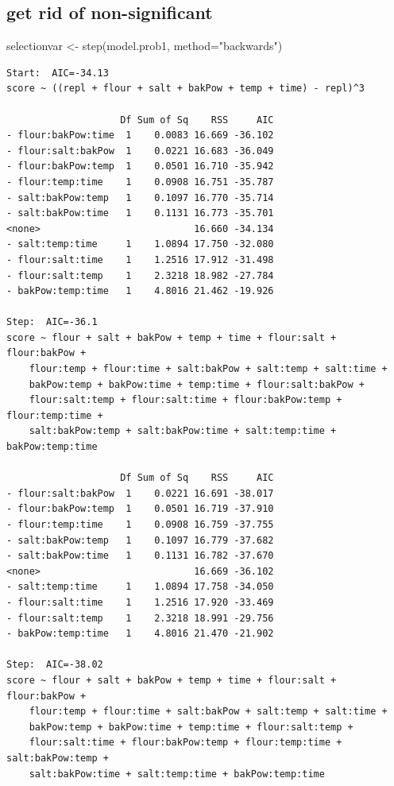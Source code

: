 \documentclass[
  a4paper,
]{scrbook}
\newenvironment{Shaded}{\begin{snugshade}}{\end{snugshade}}
\newcommand{\AttributeTok}[1]{\textcolor[rgb]{0.40,0.45,0.13}{#1}}
\newcommand{\FunctionTok}[1]{\textcolor[rgb]{0.28,0.35,0.67}{#1}}
\newcommand{\NormalTok}[1]{\textcolor[rgb]{0.00,0.23,0.31}{#1}}
\newcommand{\OtherTok}[1]{\textcolor[rgb]{0.00,0.23,0.31}{#1}}
\newcommand{\StringTok}[1]{\textcolor[rgb]{0.13,0.47,0.30}{#1}}
\begin{document}
\subsection{get rid of
non-significant}\label{get-rid-of-non-significant}

\begin{Shaded}
\begin{Highlighting}[]
\NormalTok{selectionvar }\OtherTok{\textless{}{-}} \FunctionTok{step}\NormalTok{(model.prob1, }\AttributeTok{method=}\StringTok{"backwards"}\NormalTok{)}
\end{Highlighting}
\end{Shaded}

\begin{verbatim}
Start:  AIC=-34.13
score ~ ((repl + flour + salt + bakPow + temp + time) - repl)^3

                    Df Sum of Sq    RSS     AIC
- flour:bakPow:time  1    0.0083 16.669 -36.102
- flour:salt:bakPow  1    0.0221 16.683 -36.049
- flour:bakPow:temp  1    0.0501 16.710 -35.942
- flour:temp:time    1    0.0908 16.751 -35.787
- salt:bakPow:temp   1    0.1097 16.770 -35.714
- salt:bakPow:time   1    0.1131 16.773 -35.701
<none>                           16.660 -34.134
- salt:temp:time     1    1.0894 17.750 -32.080
- flour:salt:time    1    1.2516 17.912 -31.498
- flour:salt:temp    1    2.3218 18.982 -27.784
- bakPow:temp:time   1    4.8016 21.462 -19.926

Step:  AIC=-36.1
score ~ flour + salt + bakPow + temp + time + flour:salt + flour:bakPow + 
    flour:temp + flour:time + salt:bakPow + salt:temp + salt:time + 
    bakPow:temp + bakPow:time + temp:time + flour:salt:bakPow + 
    flour:salt:temp + flour:salt:time + flour:bakPow:temp + flour:temp:time + 
    salt:bakPow:temp + salt:bakPow:time + salt:temp:time + bakPow:temp:time

                    Df Sum of Sq    RSS     AIC
- flour:salt:bakPow  1    0.0221 16.691 -38.017
- flour:bakPow:temp  1    0.0501 16.719 -37.910
- flour:temp:time    1    0.0908 16.759 -37.755
- salt:bakPow:temp   1    0.1097 16.779 -37.682
- salt:bakPow:time   1    0.1131 16.782 -37.670
<none>                           16.669 -36.102
- salt:temp:time     1    1.0894 17.758 -34.050
- flour:salt:time    1    1.2516 17.920 -33.469
- flour:salt:temp    1    2.3218 18.991 -29.756
- bakPow:temp:time   1    4.8016 21.470 -21.902

Step:  AIC=-38.02
score ~ flour + salt + bakPow + temp + time + flour:salt + flour:bakPow + 
    flour:temp + flour:time + salt:bakPow + salt:temp + salt:time + 
    bakPow:temp + bakPow:time + temp:time + flour:salt:temp + 
    flour:salt:time + flour:bakPow:temp + flour:temp:time + salt:bakPow:temp + 
    salt:bakPow:time + salt:temp:time + bakPow:temp:time


\end{verbatim}
\end{document}
